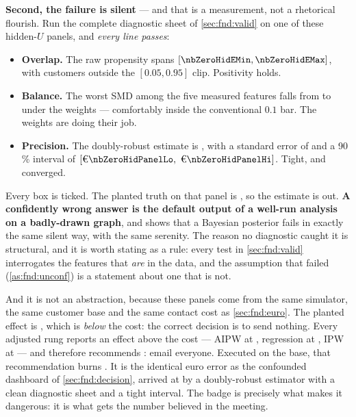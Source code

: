 \textbf{Second, the failure is silent} --- and that is a measurement, not a rhetorical flourish.
Run the complete diagnostic sheet of \cref{sec:fnd:valid} on one of these hidden-$U$ panels, and
\emph{every line passes}:

\begin{itemize}[leftmargin=*]
  \item \textbf{Overlap.} The raw propensity spans $[\nbZeroHidEMin, \nbZeroHidEMax]$, with
        \nbZeroHidClipN{} customers outside the $[0.05, 0.95]$ clip. Positivity holds.
  \item \textbf{Balance.} The worst SMD among the five measured features falls from
        \nbZeroHidSmdRaw{} to \nbZeroHidSmdIpw{} under the weights --- comfortably inside the
        conventional $0.1$ bar. The weights are doing their job.
  \item \textbf{Precision.} The doubly-robust estimate is \eur{\nbZeroHidPanelEst}, with a
        standard error of \eur{\nbZeroHidPanelSe} and a 90\,\% interval of
        $[\eur{\nbZeroHidPanelLo},\ \eur{\nbZeroHidPanelHi}]$. Tight, and converged.
\end{itemize}
%
Every box is ticked. The planted truth on that panel is \eur{\nbZeroHidPanelTrue}, so the
estimate is \eur{\nbZeroHidPanelBias} out. \textbf{A confidently wrong answer is the default
output of a well-run analysis on a badly-drawn graph}, and  shows that a Bayesian
posterior fails in exactly the same silent way, with the same serenity. The reason no diagnostic
caught it is structural, and it is worth stating as a rule: every test in \cref{sec:fnd:valid}
interrogates the features that \emph{are} in the data, and the assumption that failed
(\cref{as:fnd:unconf}) is a statement about one that is not.




And it is not an abstraction, because these panels come from the same simulator, the same
customer base and the same \eur{\nbZeroCost} contact cost as \cref{sec:fnd:euro}. The planted
effect is \eur{\nbZeroHiddenTrue}, which is \emph{below} the cost: the correct decision is to
send nothing. Every adjusted rung reports an effect above the cost --- AIPW at
\eur{\nbZeroHidAipw}, regression at \eur{\nbZeroHidReg}, IPW at \eur{\nbZeroHidIpw} --- and
therefore recommends \nbZeroHiddenVerdict: email everyone. Executed on the base, that
recommendation burns \eur{\nbZeroHiddenPolBurn}. It is the identical euro error as the confounded
dashboard of \cref{sec:fnd:decision}, arrived at by a doubly-robust estimator with a clean
diagnostic sheet and a tight interval. The badge is precisely what makes it dangerous: it is what
gets the number believed in the meeting.

